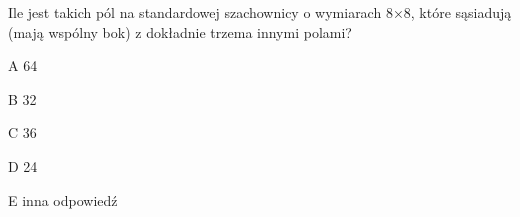 \begin{tresc}
Ile jest takich pól na standardowej szachownicy o wymiarach 8×8, które sąsiadują (mają wspólny bok) z dokładnie trzema innymi polami?
\end{tresc}
\begin{wariant}{A} 64 \end{wariant}
\begin{wariant}{B} 32 \end{wariant}
\begin{wariant}{C} 36 \end{wariant}
\begin{wariant}{D} 24 \end{wariant}
\begin{wariant}{E} inna odpowiedź \end{wariant}
